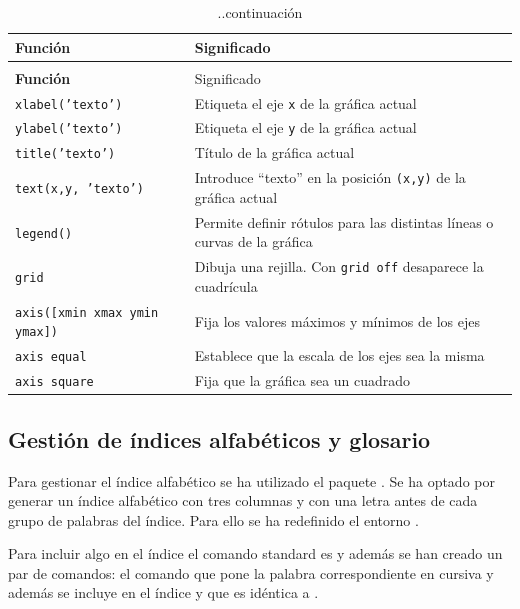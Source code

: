 \begin{longtable}{p{3.5cm}p{8cm}}
\caption{Funciones de manipulación de gráficos} \label{tab01-08}\\
\hline
{\rule[-8pt]{0pt}{22pt}\bfseries{Función}} & Significado\\
\hline %
\endfirsthead
\caption[]{..continuación} \\
\hline
{\rule[-8pt]{0pt}{22pt}\bfseries{Función}} & Significado\\
\hline %
\endhead
\hline
\endfoot %
\texttt{xlabel('texto')} & Etiqueta el eje \texttt{x} de la gráfica actual\\ 
\texttt{ylabel('texto')} & Etiqueta el eje \texttt{y} de la gráfica actual\\ 
\texttt{title('texto')} & Título de la gráfica actual\\ 
\texttt{text(x,y, 'texto')} & Introduce ``texto'' en la posición \texttt{(x,y)} de la gráfica actual\\ 
\texttt{legend()} & Permite definir rótulos para las distintas líneas o curvas de la gráfica\\ 
\texttt{grid} & Dibuja una rejilla. Con \texttt{grid off} desaparece la cuadrícula\\ 
\texttt{axis([xmin xmax ymin ymax])} & Fija los valores máximos y mínimos de los ejes\\ 
\texttt{axis equal} &Establece que la escala de los ejes sea la misma\\ 
\texttt{axis square} & Fija que la gráfica sea un cuadrado\\ 
\end{longtable}

\subsection{Gestión de índices alfabéticos y glosario}
Para gestionar el índice alfabético se ha utilizado el paquete . Se ha optado por generar un índice alfabético con tres columnas y con una letra antes de cada grupo de palabras del índice. Para ello se ha redefinido el entorno .

Para incluir algo en el índice el comando standard es  y además se han creado un par de comandos: el comando  que pone la palabra correspondiente en cursiva y además se incluye en el índice y  que es idéntica a .

